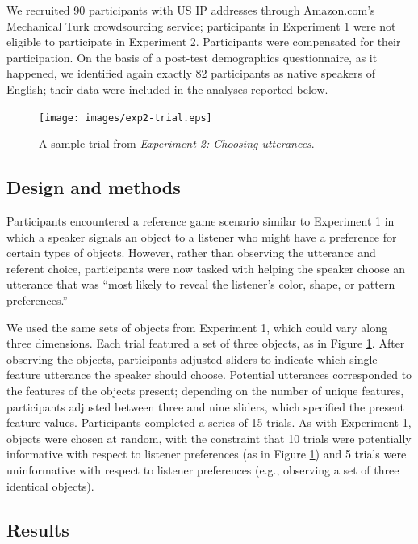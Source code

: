 \documentclass[10pt,a4paper]{article}
\begin{document}
We recruited 90 participants with US IP addresses through Amazon.com's Mechanical Turk crowdsourcing service; participants in Experiment 1 were not eligible to participate in Experiment 2. Participants were compensated for their participation. On the basis of a post-test demographics questionnaire, as it happened, we identified again exactly 82 participants as native speakers of English; their data were included in the analyses reported below.

\begin{figure}[ht]
	\centering
	\texttt{[image: images/exp2-trial.eps]}
	\caption{A sample trial from \emph{Experiment 2: Choosing utterances}.}\label{exp2-trial}
\end{figure}


\subsection{Design and methods}

Participants encountered a reference game scenario similar to Experiment 1 in which a speaker signals an object to a listener who might have a preference for certain types of objects. However, rather than observing the utterance and referent choice, participants were now tasked with helping the speaker choose an utterance that was ``most likely to reveal the listener's color, shape, or pattern preferences.''

We used the same sets of objects from Experiment 1, which could vary along three dimensions. Each trial featured a set of three objects, as in Figure \ref{exp2-trial}. After observing the objects, participants adjusted sliders to indicate which single-feature utterance the speaker should choose. Potential utterances corresponded to the features of the objects present; depending on the number of unique features, participants adjusted between three and nine sliders, which specified the present feature values. Participants completed a series of 15 trials. As with Experiment 1, objects were chosen at random, with the constraint that 10 trials were potentially informative with respect to listener preferences (as in Figure \ref{exp2-trial}) and 5 trials were uninformative with respect to listener preferences (e.g., observing a set of three identical objects). 

\subsection{Results}
\end{document}
